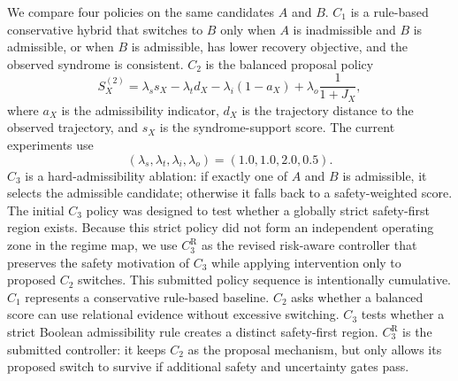 \documentclass{iopjournal}
\begin{document}
We compare four policies on the same candidates $A$ and $B$. $C_1$ is a
rule-based conservative hybrid that switches to $B$ only when $A$ is inadmissible
and $B$ is admissible, or when $B$ is admissible, has lower recovery objective, and
the observed syndrome is consistent. $C_2$ is the balanced proposal policy
\begin{equation}
S_X^{(2)}
=
\lambda_s s_X
-\lambda_t d_X
-\lambda_i(1-a_X)
+\lambda_o\frac{1}{1+J_X},
\end{equation}
where $a_X$ is the admissibility indicator, $d_X$ is the trajectory distance to the
observed trajectory, and $s_X$ is the syndrome-support score. The current
experiments use
\begin{equation}
(\lambda_s,\lambda_t,\lambda_i,\lambda_o)=(1.0,1.0,2.0,0.5).
\end{equation}
$C_3$ is a hard-admissibility ablation: if exactly one of $A$ and $B$ is
admissible, it selects the admissible candidate; otherwise it falls back to a
safety-weighted score. The initial $C_3$ policy was designed to test whether a
globally strict safety-first region exists. Because this strict policy did not form
an independent operating zone in the regime map, we use $C_3^{\mathrm{R}}$ as the
revised risk-aware controller that preserves the safety motivation of $C_3$ while
applying intervention only to proposed $C_2$ switches.
This submitted policy sequence is intentionally cumulative. $C_1$ represents a conservative
rule-based baseline. $C_2$ asks whether a balanced score can use relational
evidence without excessive switching. $C_3$ tests whether a strict Boolean
admissibility rule creates a distinct safety-first region. $C_3^{\mathrm R}$ is
the submitted controller: it keeps $C_2$ as the proposal
mechanism, but only allows its proposed switch to survive if additional safety and
uncertainty gates pass.
\end{document}
